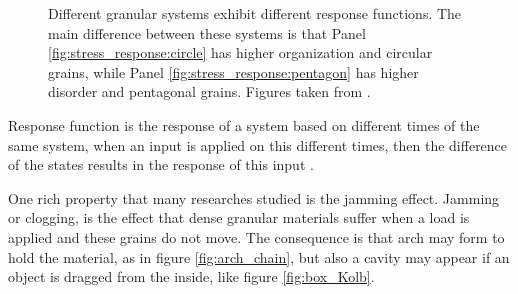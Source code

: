 \begin{figure}
\begin{minipage}{.45\linewidth}
        \label{fig:stress_response:pentagon}
    \end{minipage}
    \caption[Stress response in ordered/disordered granular packings.]{Different granular systems exhibit different response functions. The main difference between these systems is that Panel \ref{fig:stress_response:circle} has higher organization and circular grains, while Panel \ref{fig:stress_response:pentagon} has higher disorder and pentagonal grains. Figures taken from \cite{Sensitivity_of_Stress_Response_Function_to_Packing_Preparation}.}
    \label{fig:stress_response}
\end{figure}

    Response function is the response of a system based on different times of the same system, when an input is applied on this different times, then the difference of the states results in the response of this input \cite{The_Physics_of_Granular_Media}.

    One rich property that many researches studied \cite{Caio-Tese, Felipe-Tese, Eduardo-Tese, Non-Gaussian_behavior_in_jamming_unjamming_transition_in_dense_granular_materials, Da_Cruz-Tese} is the jamming effect. Jamming or clogging, is the effect that dense granular materials suffer when a load is applied and these grains do not move. The consequence is that arch may form to hold the material, as in figure \ref{fig:arch_chain}, but also a cavity may appear if an object is dragged from the inside, like figure \ref{fig:box_Kolb}.

